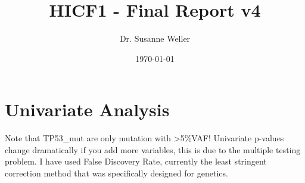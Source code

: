 \documentclass[a4paper,11pt]{article}
\title{HICF1 -  Final Report v4}
\author{Dr. Susanne Weller}
\date{\today}
\begin{document}


\maketitle
\tableofcontents
\section{Univariate Analysis}
Note that TP53\_mut are only mutation with >5\%VAF! Univariate p-values change dramatically if you add more variables, this is due to the multiple testing problem. I have used False Discovery Rate, currently the least stringent correction method that was specifically designed for genetics.

\end{document}
